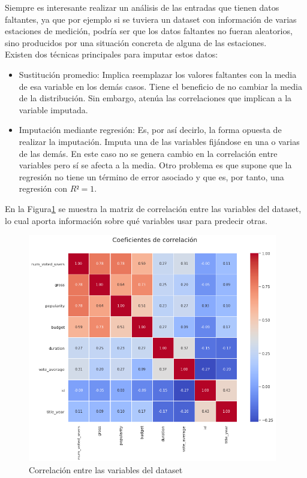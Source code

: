 Siempre es interesante realizar un análisis de las entradas que tienen datos faltantes, ya que por ejemplo si se tuviera un dataset con información de varias estaciones de medición, podría ser que los datos faltantes no fueran aleatorios, sino producidos por una situación concreta de alguna de las estaciones.\\

Existen dos técnicas principales para imputar estos datos:

\begin{itemize}
    \item Sustitución promedio: Implica reemplazar los valores faltantes con la media de esa variable en los demás casos. Tiene el beneficio de no cambiar la media de la distribución. Sin embargo, atenúa las correlaciones que implican a la variable imputada.
    \item Imputación mediante regresión: Es, por así decirlo, la forma opuesta de realizar la imputación. Imputa una de las variables fijándose en una o varias de las demás. En este caso no se genera cambio en la correlación entre variables pero sí se afecta a la media. Otro problema es que supone que la regresión no tiene un término de error asociado y que es, por tanto, una regresión con $R² = 1$.
\end{itemize}

En la Figura\ref{fig:correlation} se muestra la matriz de correlación entre las variables del dataset, lo cual aporta información sobre qué variables usar para predecir otras.

\begin{figure}[H]
    \centering
    \captionsetup{width=12cm}
    \includegraphics[height=10cm]{./contenido/imagenes/correlation.png}
\caption{Correlación entre las variables del dataset}
\label{fig:correlation}
\end{figure}

